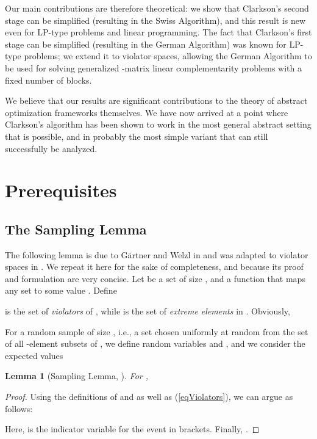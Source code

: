 \documentclass[12pt]{article}
\newtheorem{lemma2}[theorem2]{Lemma}
\newenvironment{lemma}{\begin{lemma2}}{\end{lemma2}}
\theoremstyle{remark}
\begin{document}
Our main contributions are therefore theoretical: we show that
Clarkson's second stage can be simplified (resulting in the Swiss
Algorithm), and this result is new even for LP-type problems and
linear programming. The
fact that Clarkson's first stage can be simplified (resulting in the
German Algorithm) was known for LP-type problems; we extend it to
violator spaces, allowing the German Algorithm to be used for solving
generalized -matrix linear complementarity problems with a fixed
number of blocks.

We  believe that our results are significant
contributions to the theory of abstract optimization frameworks
themselves. We have now arrived at a point where Clarkson's algorithm
has been shown to work in the most general abstract setting that is
possible, and in probably the most simple variant that can still
successfully be analyzed.



\section{Prerequisites}

\subsection{The Sampling Lemma}
The following lemma is due to G\"artner and Welzl in 
\cite{GWSampl01} and was adapted to violator
spaces in \cite{journals/dam/GartnerMRS08}. We repeat it here for the sake
of completeness, and because its proof and formulation are very
concise.
Let  be a set of size , and   a function that maps any
set  to some value . Define

 is the set of \emph{violators} of , while
 is the set of \emph{extreme elements} in . Obviously,


For a random sample  of size , i.e., a set  chosen uniformly at random from the set  of all -element subsets of , we define random variables  and
, and we consider the expected values



\begin{lemma}[Sampling Lemma, \cite{GWSampl01, journals/dam/GartnerMRS08}]
\label{lemma:sampling}
For ,

\end{lemma}
\begin{proof}
	Using the definitions of  and  as well as (\ref{eqViolators}), we can argue as 
follows:


\begin{center}

\end{center}


Here,  is the indicator variable for the event in brackets. Finally, .
\end{proof}
\end{document}
